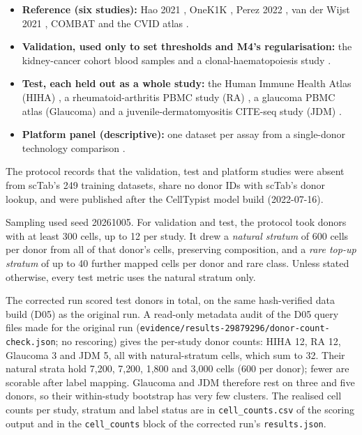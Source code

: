 \documentclass[11pt]{article}
\begin{document}
\begin{itemize}
\item \textbf{Reference (six studies):} Hao 2021 \citep{hao2021seurat}, OneK1K \citep{yazar2022onek1k}, Perez 2022 \citep{perez2022lupus}, van der Wijst 2021 \citep{vanderwijst2021}, COMBAT \citep{combat2022} and the CVID atlas \citep{rodriguezubreva2022cvid}.
\item \textbf{Validation, used only to set thresholds and M4's regularisation:} the kidney-cancer cohort blood samples \citep{li2022kidney} and a clonal-haematopoiesis study \citep{heimlich2024ch}.
\item \textbf{Test, each held out as a whole study:} the Human Immune Health Atlas (HIHA) \citep{gong2025hiha}, a rheumatoid-arthritis PBMC study (RA) \citep{binvignat2024ra}, a glaucoma PBMC atlas (Glaucoma) \citep{glaucomacollection} and a juvenile-dermatomyositis CITE-seq study (JDM) \citep{rabadam2024jdm}.
\item \textbf{Platform panel (descriptive):} one dataset per assay from a single-donor technology comparison \citep{desimone2025platforms}.
\end{itemize}

\noindent The protocol records that the validation, test and platform studies were absent from scTab's 249 training datasets, share no donor IDs with scTab's donor lookup, and were published after the CellTypist model build (2022-07-16).

Sampling used seed 20261005. For validation and test, the protocol took donors with at least 300 cells, up to 12 per study. It drew a \emph{natural stratum} of 600 cells per donor from all of that donor's cells, preserving composition, and a \emph{rare top-up stratum} of up to 40 further mapped cells per donor and rare class. Unless stated otherwise, every test metric uses the natural stratum only.

The corrected run scored  test donors in total, on the same hash-verified data build (D05) as the original run. A read-only metadata audit of the D05 query files made for the original run (\nolinkurl{evidence/results-29879296/donor-count-check.json}; no rescoring) gives the per-study donor counts: HIHA 12, RA 12, Glaucoma 3 and JDM 5, all with natural-stratum cells, which sum to 32. Their natural strata hold 7{,}200, 7{,}200, 1{,}800 and 3{,}000 cells (600 per donor); fewer are scorable after label mapping. Glaucoma and JDM therefore rest on three and five donors, so their within-study bootstrap has very few clusters. The realised cell counts per study, stratum and label status are in \nolinkurl{cell_counts.csv} of the scoring output and in the \nolinkurl{cell_counts} block of the corrected run's \nolinkurl{results.json}.
\end{document}
